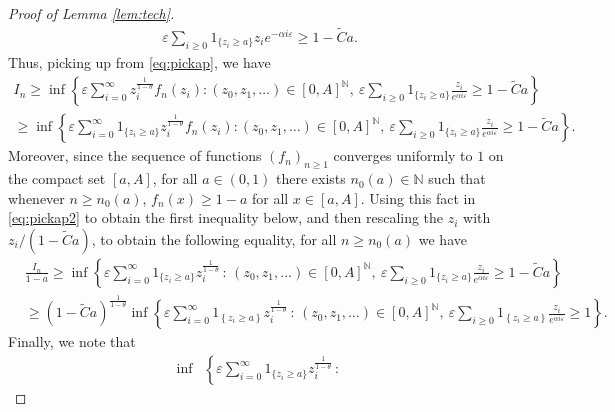 \documentclass[a4,12pt]{amsart}
\numberwithin{equation}{section}
\begin{document}
\begin{appendix}
\begin{proof}[Proof of Lemma \ref{lem:tech}]
\begin{align*}
			\varepsilon \sum_{i \geq 0} \mathrm{1}_{\{z_i \geq a\}} 
			z_i e^{-\alpha i \varepsilon} 
			\geq 1 - \tilde{C}a.
		\end{align*}
		Thus, picking up from \eqref{eq:pickap}, we have
		\begin{multline} \label{eq:pickap2}
			I_n \geq  
			\inf\left\{  \varepsilon  \sum_{i=0}^{\infty} z_i^{\frac{1}{1-\theta}}f_n(z_i) 
			: (z_0,z_1,\ldots)\in[0,A]^{\mathbb{N}}, \:
			\varepsilon 
			\sum_{i \geq 0} \mathrm{1}_{\{z_i \geq a\}} \frac{z_i}{e^{  \alpha i \varepsilon}}
			\geq 1 - \tilde{C}a  \right\}  \\
			\geq  \inf\left\{  \varepsilon  
			\sum_{i=0}^{\infty}\mathrm{1}_{\{z_i \geq a\}}z_i^{\frac{1}{1-\theta}}f_n(z_i) 
			:(z_0,z_1,\ldots)\in[0,A]^{\mathbb{N}}, \:
			\varepsilon 
			\sum_{i \geq 0} \mathrm{1}_{\{z_i \geq a\}} \frac{z_i}{e^{ \alpha i \varepsilon} }
			\geq 1 - \tilde{C}a  \right\}.
		\end{multline}
		Moreover, since the sequence of functions $(f_n)_{n \geq 1}$ converges 
		uniformly to $1$ on the compact set $[a,A]$, for all $a\in (0,1)$ there exists 
		$n_0(a)\in\mathbb N$ such that whenever $n \geq n_0(a)$, 
		$f_n(x) \geq 1 - a$ for all $x \in [a,A]$. 
		Using this fact in \eqref{eq:pickap2} to obtain the first inequality below, 
		and then rescaling the $z_i$  with $z_i/(1 - \tilde{C}a)$, 
		to obtain the following equality, for all $n \geq n_0(a)$ we have 
		\begin{equation} \label{eq:pickap3}
        \begin{split}
		&\frac{I_n}{1-a}\geq 
			\inf\left\{  \varepsilon  
				\sum_{i=0}^{\infty}\mathrm{1}_{\{z_i \geq a\}}
			z_i^{\frac{1}{1-\theta}}
			\,:\, (z_0,z_1,\ldots)\in[0,A]^{\mathbb{N}}, \: 
			\varepsilon \sum_{i \geq 0} 
			\mathrm{1}_{\{z_i \geq a\}} \frac{z_i}{e^{ \alpha i \varepsilon} }
			\geq 1 - \tilde{C}a  \right\} \\
			&\geq (1 - \tilde{C}a)^{\frac{1}{1-\theta}} 
			\inf\left\{  \varepsilon  
				\sum_{i=0}^{\infty}\mathrm{1}_{\left\{z_i \geq a\right\}}z_i^{\frac{1}{1-\theta}}
			\,:\, (z_0,z_1,\ldots)\in[0,A]^{\mathbb{N}}, \:
			   \varepsilon 
			   \sum_{i \geq 0} \mathrm{1}_{\left\{z_i \geq a \right\}} 
		   \frac{z_i}{e^{  \alpha i \varepsilon}} \geq 1 \right\}.
		\end{split}
        \end{equation}
		Finally, we note that
		\begin{align*} 
		\inf&\left\{  \varepsilon  \sum_{i=0}^{\infty}\mathrm{1}_{\{z_i \geq a\}} z_i^{\frac{1}{1-\theta}}\,:\, 

\end{align*}
\end{proof}
\end{appendix}
\end{document}
